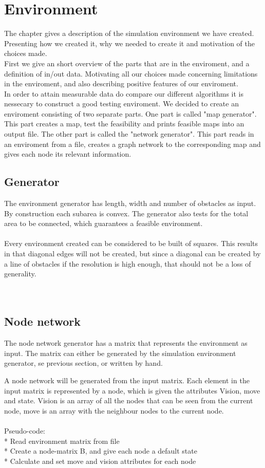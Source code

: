 \chapter{Environment}
The chapter gives a description of the simulation environment we have created. Presenting how we created it, why we needed to create it and motivation of the choices made.\\
First we give an short overview of the parts that are in the enviroment, and a definition of in/out data. Motivating all our choices made concerning limitations in the enviroment, and also describing positive features of our enviroment.
\\
In order to attain measurable data do compare our different algorithms it is nessecary to construct a good testing enviroment. We decided to create an enviroment consisting of two separate parts. One part is called "map generator". This part creates a map, test the feasibility and prints feasible maps into an output file. The other part is called the "network generator". This part reads in an enviroment from a file, creates a graph network to the corresponding map and gives each node its relevant information. 
\\
\section{Generator}
The environment generator has length, width and number of obstacles as input. By construction each subarea is convex. The generator also tests for the total area to be connected, which guarantees a feasible environment.\\
\\
Every environment created can be considered to be built of squares. This results in that diagonal edges will not be created, but since a diagonal can be created by a line of obstacles if the resolution is high enough, that should not be a loss of generality. \\
\\
\\
\section{Node network}
The node network generator has a matrix that represents the environment as input. The matrix can either be generated by the simulation environment generator, se previous section, or written by hand.\\
\par{} A node network will be generated from the input matrix. Each element in the input matrix is represented by a node, which is given the attributes Vision, move and state. Vision is an array of all the nodes that can be seen from the current node, move is an array with the neighbour nodes to the current node.\\
\\
Pseudo-code:\\
* Read environment matrix from file\\
* Create a node-matrix B, and give each node a default state\\
* Calculate and set move and vision attributes for each node\\